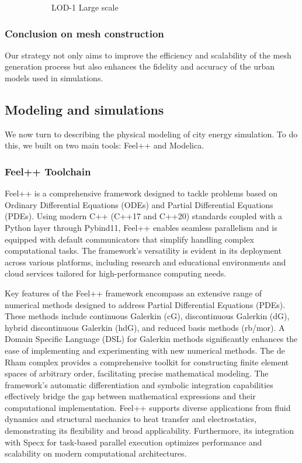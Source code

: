 \documentclass[runningheads]{llncs}
\begin{document}
\begin{figure}[htbp]
\begin{subfigure}{.4\textwidth}
  \caption{LOD-1 Large scale}
  \label{fig:city-ny-largescale}
\end{subfigure}
\caption{}
\label{fig:partitioning}
\end{figure}

\subsubsection{Conclusion on mesh construction}
Our strategy not only aims to improve the efficiency and scalability of the mesh generation process but also enhances the fidelity and accuracy of the urban models used in simulations.

\subsection{Modeling and simulations}

We now turn to describing the physical modeling of city energy simulation.
To do this, we built on two main tools: Feel++ and Modelica. 

\subsubsection{Feel++ Toolchain}

Feel++ is a comprehensive framework designed to tackle problems based on Ordinary Differential Equations (ODEs) and Partial Differential Equations (PDEs). Using modern C++ (C++17 and C++20) standards coupled with a Python layer through Pybind11, Feel++ enables seamless parallelism and is equipped with default communicators that simplify handling complex computational tasks. The framework's versatility is evident in its deployment across various platforms, including research and educational environments and cloud services tailored for high-performance computing needs.

Key features of the Feel++ framework encompass an extensive range of numerical methods designed to address Partial Differential Equations (PDEs). These methods include continuous Galerkin (cG), discontinuous Galerkin (dG), hybrid discontinuous Galerkin (hdG), and reduced basis methods (rb/mor). A Domain Specific Language (DSL) for Galerkin methods significantly enhances the ease of implementing and experimenting with new numerical methods. The de Rham complex provides a comprehensive toolkit for constructing finite element spaces of arbitrary order, facilitating precise mathematical modeling. The framework's automatic differentiation and symbolic integration capabilities effectively bridge the gap between mathematical expressions and their computational implementation. Feel++ supports diverse applications from fluid dynamics and structural mechanics to heat transfer and electrostatics, demonstrating its flexibility and broad applicability. Furthermore, its integration with Specx for task-based parallel execution optimizes performance and scalability on modern computational architectures.
\end{document}
